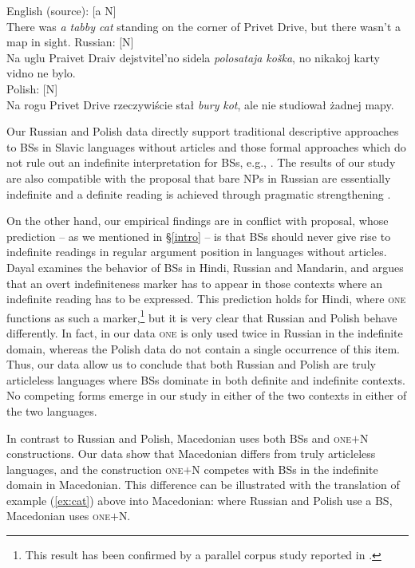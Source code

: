 \documentclass[output=paper,colorlinks,citecolor=brown]{langscibook}
\begin{document}
\ea \ea \label{ex:cat} English (source): [a N]			 \\
There was \textit{a tabby cat} standing on the corner of Privet Drive, but there wasn't a map in sight.
\ex  Russian: [N]\\
Na uglu Praivet Draiv dejstvitel'no sidela \textit{polosataja} \textit{ko\v{s}ka}, no nikakoj karty vidno ne bylo.\\
\ex Polish: [N] \\
 Na rogu Privet Drive rzeczywi\'{s}cie stał \textit{bury} \textit{kot}, ale nie studiował żadnej mapy. \\
\z\z

\noindent Our Russian and Polish data directly support traditional descriptive approaches to BSs in Slavic languages without articles and those formal approaches which do not rule out an indefinite interpretation for BSs, e.g., \citet{Chierchia1998, Krifka2003}. The results of our study are also compatible with the proposal that bare NPs in Russian are essentially indefinite and a definite reading is achieved through pragmatic strengthening \citep{Seres.Borik2021}.

On the other hand, our empirical findings are in conflict with  proposal, whose prediction -- as we mentioned in \S \ref{intro} -- is that BSs should never give rise to indefinite readings in regular argument position in languages without articles. Dayal examines the behavior of BSs in Hindi, Russian and Mandarin, and argues that  an overt indefiniteness marker has to appear in those contexts where an indefinite reading has to be expressed. This prediction holds for Hindi, where \textsc{one} functions as such a marker,\footnote{This result has been confirmed by a parallel corpus study reported in \citet{Liuetal2022}.} but it is very clear that Russian and Polish behave differently. In fact, in our data \textsc{one} is only used twice in Russian in the indefinite domain, whereas the Polish data do not contain a single occurrence of this item. Thus, our data allow us to conclude that both Russian and Polish are truly articleless languages where BSs dominate in both definite and indefinite contexts. No competing forms emerge in our study in either of the two contexts in either of the two languages. 

In contrast to Russian and Polish, Macedonian uses both BSs and \textsc{one}$+$N constructions. Our data show that Macedonian differs from truly articleless languages, and the construction \textsc{one}$+$N competes with BSs in the indefinite domain in Macedonian. This difference can be illustrated with the translation of example (\ref{ex:cat}) above into Macedonian: where Russian and Polish use a BS, Macedonian uses \textsc{one}$+$N. 
\end{document}
